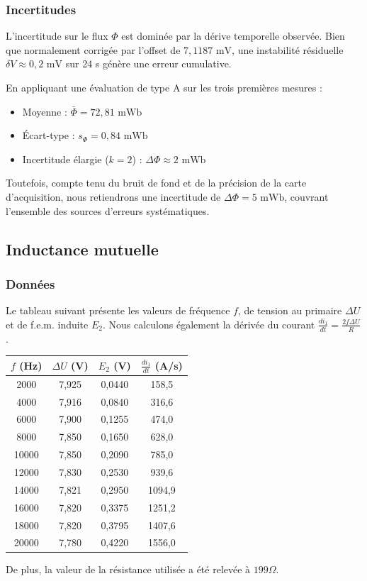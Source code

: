 \documentclass[a4paper,9pt,french]{scrartcl}
\begin{document}
\subsubsection{Incertitudes}
L'incertitude sur le flux $\Phi$ est dominée par la dérive temporelle observée. Bien que normalement corrigée par l'offset de $7,1187 \text{ mV}$, une instabilité résiduelle $\delta V \approx 0,2 \text{ mV}$ sur 24 s génère une erreur cumulative. 

En appliquant une évaluation de type A sur les trois premières mesures :
\begin{itemize}
    \item Moyenne : $\bar{\Phi} = 72,81 \text{ mWb}$
    \item Écart-type : $s_{\Phi} = 0,84 \text{ mWb}$
    \item Incertitude élargie ($k=2$) : $\Delta \Phi \approx 2 \text{ mWb}$
\end{itemize}
Toutefois, compte tenu du bruit de fond et de la précision de la carte d'acquisition, nous retiendrons une incertitude de $\Delta\Phi = 5 \text{ mWb}$, couvrant l'ensemble des sources d'erreurs systématiques.
\subsection{Inductance mutuelle}
\subsubsection{Données}
Le tableau suivant présente les valeurs de fréquence $f$, de tension au primaire $\Delta U$ et de f.e.m. induite $E_2$. Nous calculons également la dérivée du courant $\frac{di_1}{dt} = \frac{2f \Delta U}{R}$.

\begin{center}
\begin{tabular}{|c|c|c|c|}
\hline
$f$ (Hz) & $\Delta U$ (V) & $E_2$ (V) & $\frac{di_1}{dt}$ (A/s) \\
\hline
2000  & 7,925 & 0,0440 & 158,5 \\
4000  & 7,916 & 0,0840 & 316,6 \\
6000  & 7,900 & 0,1255 & 474,0 \\
8000  & 7,850 & 0,1650 & 628,0 \\
10000 & 7,850 & 0,2090 & 785,0 \\
12000 & 7,830 & 0,2530 & 939,6 \\
14000 & 7,821 & 0,2950 & 1094,9 \\
16000 & 7,820 & 0,3375 & 1251,2 \\
18000 & 7,820 & 0,3795 & 1407,6 \\
20000 & 7,780 & 0,4220 & 1556,0 \\
\hline
\end{tabular}
\end{center}
De plus, la valeur de la résistance utilisée a été relevée à $199\Omega$.
\end{document}
